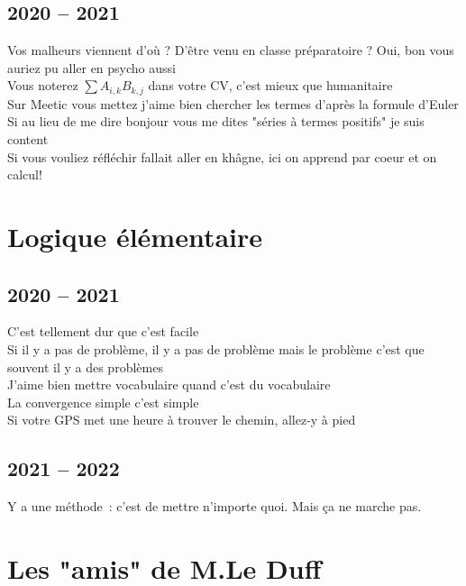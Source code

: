 \documentclass[french, a4paper, openany]{book}
\begin{document}
\section{2020 -- 2021}

	\noindent \og Vos malheurs viennent d'où ? D'être venu en classe préparatoire ? Oui, bon vous auriez pu aller en psycho aussi \fg \\
	\og Vous noterez $\sum A_{i,k} B_{k,j}$ dans votre CV, c'est mieux que humanitaire \fg \\
	\og Sur Meetic vous mettez \og j'aime bien chercher les termes d'après la formule d'Euler \fg \\
	\og Si au lieu de me dire bonjour vous me dites "séries à termes positifs" je suis content \fg \\
	\og Si vous vouliez réfléchir fallait aller en khâgne, ici on apprend par coeur et on calcul! \fg \\

\chapter{Logique élémentaire}

\section{2020 -- 2021}

	\noindent \og C'est tellement dur que c'est facile \fg \\
	\og Si il y a pas de problème, il y a pas de problème mais le problème c'est que souvent il y a des problèmes \fg \\
	\og J'aime bien mettre vocabulaire quand c'est du vocabulaire \fg \\
	\og La convergence simple c'est simple \fg \\
	\og Si votre GPS met une heure à trouver le chemin, allez-y à pied \fg \\

\section{2021 -- 2022}

	\noindent \og Y a une méthode~: c'est de mettre n'importe quoi. Mais ça ne marche pas. \fg \\

\chapter{Les "amis" de M.Le Duff}
\end{document}
